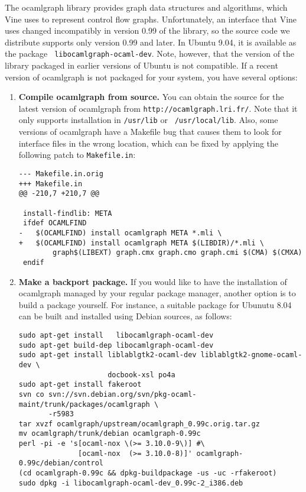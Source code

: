 \documentclass[11pt,onecolumn]{article}
\let\url\nolinkurl %
\begin{document}
The ocamlgraph library provides graph data structures and algorithms,
which Vine uses to represent control flow graphs.
%
Unfortunately, an interface that Vine uses changed incompatibly in
version 0.99 of the library, so the source code we distribute supports
only version 0.99 and later.
%
In Ubuntu 9.04, it is available as the package {\tt
libocamlgraph-ocaml-dev}.
%
Note, however, that the version of the library packaged in earlier
versions of Ubuntu is not compatible.
%
If a recent version of ocamlgraph is not packaged for your system, you
have several options:
\begin{enumerate}
\item {\bf Compile ocamlgraph from source.}
You can obtain the source for the latest version of ocamlgraph from
\url{http://ocamlgraph.lri.fr/}.
%
Note that it only supports installation in {\tt /usr/lib} or {\tt
/usr/local/lib}.
%
Also, some versions of ocamlgraph have a Makefile bug that causes them
to look for interface files in the wrong location, which can be fixed
by applying the following patch to {\tt Makefile.in}:

\begin{Verbatim}[frame=lines, framesep=.5em]
--- Makefile.in.orig
+++ Makefile.in
@@ -210,7 +210,7 @@
 
 install-findlib: META
 ifdef OCAMLFIND
-	$(OCAMLFIND) install ocamlgraph META *.mli \
+	$(OCAMLFIND) install ocamlgraph META $(LIBDIR)/*.mli \
 		graph$(LIBEXT) graph.cmx graph.cmo graph.cmi $(CMA) $(CMXA)
 endif
\end{Verbatim}

\item {\bf Make a backport package.}
If you would like to have the installation of ocamlgraph managed by
your regular package manager, another option is to build a package
yourself. For instance, a suitable package for Ubunutu 8.04 can be
built and installed using Debian sources, as follows:

\begin{Verbatim}[frame=lines, framesep=.5em]
sudo apt-get install   libocamlgraph-ocaml-dev
sudo apt-get build-dep libocamlgraph-ocaml-dev
sudo apt-get install liblablgtk2-ocaml-dev liblablgtk2-gnome-ocaml-dev \
                     docbook-xsl po4a
sudo apt-get install fakeroot
svn co svn://svn.debian.org/svn/pkg-ocaml-maint/trunk/packages/ocamlgraph \
       -r5983
tar xvzf ocamlgraph/upstream/ocamlgraph_0.99c.orig.tar.gz
mv ocamlgraph/trunk/debian ocamlgraph-0.99c
perl -pi -e 's[ocaml-nox \(>= 3.10.0-9\)] #\
              [ocaml-nox  (>= 3.10.0-8)]' ocamlgraph-0.99c/debian/control
(cd ocamlgraph-0.99c && dpkg-buildpackage -us -uc -rfakeroot)
sudo dpkg -i libocamlgraph-ocaml-dev_0.99c-2_i386.deb
\end{Verbatim}


\end{enumerate}
\end{document}
